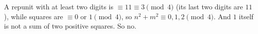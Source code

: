 A repunit with at least two digits is $\equiv11\equiv3\pmod4$ (its last two digits are $11$), while squares are $\equiv0$ or $1\pmod4$, so $n^2+m^2\equiv0,1,2\pmod4$. And $1$ itself is not a sum of two positive squares. So $\boxed{\text{no}}$.

